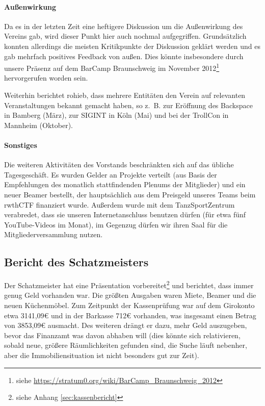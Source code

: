 \documentclass[a4paper,12pt]{scrartcl}
\begin{document}
\paragraph{Außenwirkung}
Da es in der letzten Zeit eine heftigere Diskussion um die Außenwirkung des
Vereins gab, wird dieser Punkt hier auch nochmal aufgegriffen. Grundsätzlich
konnten allerdings die meisten Kritikpunkte der Diskussion geklärt werden und es
gab mehrfach positives Feedback von außen. Dies könnte insbesondere durch unsere
Präsenz auf dem BarCamp Braunschweig im November 2012\footnote{siehe
\url{https://stratum0.org/wiki/BarCamp_Braunschweig_2012}} hervorgerufen worden
sein.

Weiterhin berichtet rohieb, dass mehrere Entitäten den Verein auf relevanten
Veranstaltungen bekannt gemacht haben, so z.~B. zur Eröffnung des Backspace in
Bamberg (März), zur SIGINT in Köln (Mai) und bei der TrollCon in Mannheim
(Oktober).

\paragraph{Sonstiges}
Die weiteren Aktivitäten des Vorstands beschränkten sich auf das übliche
Tagesgeschäft. Es wurden Gelder an Projekte verteilt (aus Basis der Empfehlungen
des monatlich stattfindenden Plenums der Mitglieder) und ein neuer Beamer
bestellt, der hauptsächlich aus dem Preisgeld unseres Teams beim rwthCTF
finanziert wurde. Außerdem wurde mit dem TanzSportZentrum verabredet, dass sie
unseren Internetanschluss benutzen dürfen (für etwa fünf YouTube-Videos im
Monat), im Gegenzug dürfen wir ihren Saal für die Mitgliederversammlung nutzen.

\subsection{Bericht des Schatzmeisters}
Der Schatzmeister hat eine Präsentation vorbereitet\footnote{siehe Anhang
\ref{sec:kassenbericht}} und berichtet, dass immer genug Geld vorhanden war. Die
größten Ausgaben waren Miete, Beamer und die neuen Küchenmöbel. Zum Zeitpunkt
der Kassenprüfung war auf dem Girokonto etwa 3141{,}09€ und in der Barkasse 712€
vorhanden, was insgesamt einen Betrag von 3853{,}09€ ausmacht. Des weiteren
drängt er dazu, mehr Geld auszugeben, bevor das Finanzamt was davon abhaben
will (dies könnte sich relativieren, sobald neue, größere Räumlichkeiten
gefunden sind, die Suche läuft nebenher, aber die Immobiliensituation ist nicht
besonders gut zur Zeit).
\end{document}
